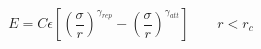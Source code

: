 


$$
 E =  C \epsilon \left[ \left(\frac{\sigma}{r}\right)^{\gamma_{rep}} - \left(\frac{\sigma}{r}\right)^{\gamma_{att}} \right]
                       \qquad r < r_c
$$


